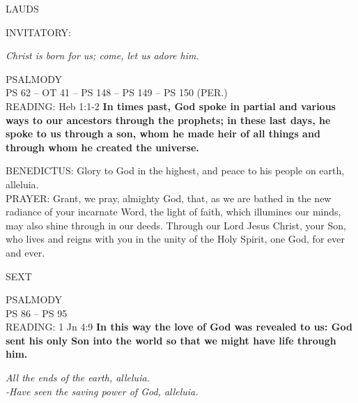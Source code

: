 \begin{flushleft}\normalsize{\uppercase{LAUDS\\}}\end{flushleft}
\small{\uppercase{INVITATORY:}}\normalsize
\begin{center}
\textit{Christ is born for us; come, let us adore him.\\}
\end{center}
\noindent\small{\uppercase{PSALMODY}\\}
\uppercase{Ps 62 -- OT 41 -- Ps 148 -- Ps 149 -- Ps 150 (Per.)}\vspace{0.5em}\\

\noindent\small{\uppercase{READING:}}    Heb 1:1-2 \textbf{    In times past, God spoke in partial and various ways to our ancestors through the prophets; in these last days, he spoke to us through a son, whom he made heir of all things and through whom he created the universe.\\}

\noindent\small{\uppercase{BENEDICTUS:}}	Glory to God in the highest, and peace to his people on earth, alleluia.\\

\noindent\small{\uppercase{PRAYER:}}	Grant, we pray, almighty God, that, as we are bathed in the new radiance of your incarnate Word, the light of faith, which illumines our minds, may also shine through in our deeds. Through our Lord Jesus Christ, your Son, who lives and reigns with you in the unity of the Holy Spirit, one God, for ever and ever.

\begin{flushleft}\normalsize{\uppercase{SEXT\\}}\end{flushleft}
\noindent\small{\uppercase{PSALMODY}\\}
\uppercase{Ps 86 -- Ps 95}\vspace{0.5em}\\

\noindent\small{\uppercase{READING:}}    1 Jn 4:9 \textbf{     In this way the love of God was revealed to us: God sent his only Son into the world so that we might have life through him.\\}
\begin{center}\textit{All the ends of the earth, alleluia.\\
-Have seen the saving power of God, alleluia.}\end{center}

